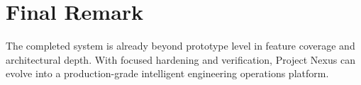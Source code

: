 \documentclass[a4paper, 11pt, oneside]{Dissertation}
\begin{document}
\section{Final Remark}
The completed system is already beyond prototype level in feature coverage and architectural depth. With focused hardening and verification, Project Nexus can evolve into a production-grade intelligent engineering operations platform.


\newpage
{}
\small{{}}

\end{document}

